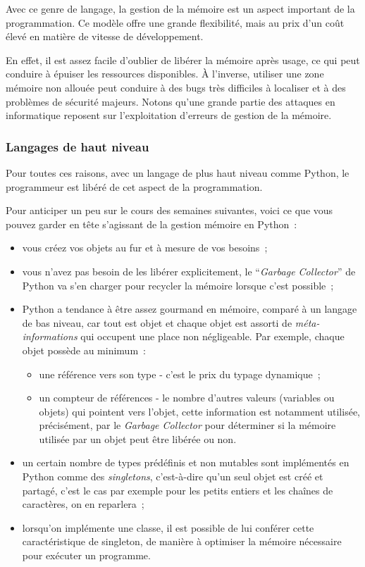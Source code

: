     Avec ce genre de langage, la gestion de la mémoire est un aspect
important de la programmation. Ce modèle offre une grande flexibilité,
mais au prix d'un coût élevé en matière de vitesse de développement.

En effet, il est assez facile d'oublier de libérer la mémoire après
usage, ce qui peut conduire à épuiser les ressources disponibles. À
l'inverse, utiliser une zone mémoire non allouée peut conduire à des
bugs très difficiles à localiser et à des problèmes de sécurité majeurs.
Notons qu'une grande partie des attaques en informatique reposent sur
l'exploitation d'erreurs de gestion de la mémoire.

    \hypertarget{langages-de-haut-niveau}{%
\subsubsection{Langages de haut niveau}\label{langages-de-haut-niveau}}

    Pour toutes ces raisons, avec un langage de plus haut niveau comme
Python, le programmeur est libéré de cet aspect de la programmation.

Pour anticiper un peu sur le cours des semaines suivantes, voici ce que
vous pouvez garder en tête s'agissant de la gestion mémoire en Python~:

\begin{itemize}
\item
  vous créez vos objets au fur et à mesure de vos besoins~;
\item
  vous n'avez pas besoin de les libérer explicitement, le
  ``\emph{Garbage Collector}'' de Python va s'en charger pour recycler
  la mémoire lorsque c'est possible~;
\item
  Python a tendance à être assez gourmand en mémoire, comparé à un
  langage de bas niveau, car tout est objet et chaque objet est assorti
  de \emph{méta-informations} qui occupent une place non négligeable.
  Par exemple, chaque objet possède au minimum~:

  \begin{itemize}
  \tightlist
  \item
    une référence vers son type - c'est le prix du typage dynamique~;
  \item
    un compteur de références - le nombre d'autres valeurs (variables ou
    objets) qui pointent vers l'objet, cette information est notamment
    utilisée, précisément, par le \emph{Garbage Collector} pour
    déterminer si la mémoire utilisée par un objet peut être libérée ou
    non.
  \end{itemize}
\item
  un certain nombre de types prédéfinis et non mutables sont implémentés
  en Python comme des \emph{singletons}, c'est-à-dire qu'un seul objet
  est créé et partagé, c'est le cas par exemple pour les petits entiers
  et les chaînes de caractères, on en reparlera~;
\item
  lorsqu'on implémente une classe, il est possible de lui conférer cette
  caractéristique de singleton, de manière à optimiser la mémoire
  nécessaire pour exécuter un programme.
\end{itemize}


    
    
    
